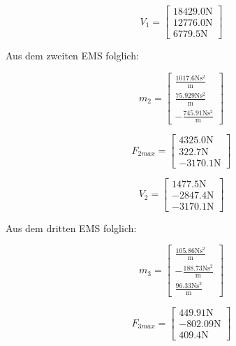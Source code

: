 \documentclass[
  letterpaper,
  DIV=11]{scrreprt}
\begin{document}
\begin{equation}V_{1} = \left[\begin{matrix}18429.0 \text{N}\\12776.0 \text{N}\\6779.5 \text{N}\end{matrix}\right]\end{equation}

Aus dem zweiten EMS folglich:

\begin{equation}m_{2} = \left[\begin{matrix}\frac{1017.6 \text{N} \text{s}^{2}}{\text{m}}\\\frac{75.929 \text{N} \text{s}^{2}}{\text{m}}\\- \frac{745.91 \text{N} \text{s}^{2}}{\text{m}}\end{matrix}\right]\end{equation}

\begin{equation}F_{2 max} = \left[\begin{matrix}4325.0 \text{N}\\322.7 \text{N}\\- 3170.1 \text{N}\end{matrix}\right]\end{equation}

\begin{equation}V_{2} = \left[\begin{matrix}1477.5 \text{N}\\- 2847.4 \text{N}\\- 3170.1 \text{N}\end{matrix}\right]\end{equation}

Aus dem dritten EMS folglich:

\begin{equation}m_{3} = \left[\begin{matrix}\frac{105.86 \text{N} \text{s}^{2}}{\text{m}}\\- \frac{188.73 \text{N} \text{s}^{2}}{\text{m}}\\\frac{96.33 \text{N} \text{s}^{2}}{\text{m}}\end{matrix}\right]\end{equation}

\begin{equation}F_{3 max} = \left[\begin{matrix}449.91 \text{N}\\- 802.09 \text{N}\\409.4 \text{N}\end{matrix}\right]\end{equation}
\end{document}
